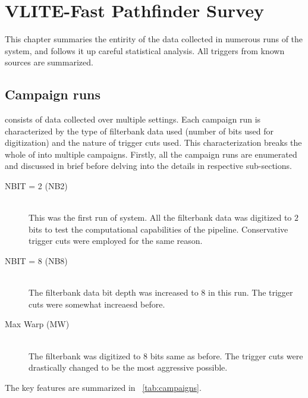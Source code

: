 \chapter{VLITE-Fast Pathfinder Survey}
\label{ch:data}

\par This chapter summaries the entirity of the data collected in numerous runs of the \vf system, and follows it up careful statistical analysis. All triggers from known sources are summarized.

\section {Campaign runs}
\label{sec:camp}

\par \vfpfs consists of data collected over multiple settings. 
Each campaign run is characterized by the type of filterbank data used (number of bits used for digitization) and the nature of trigger cuts used. 
This characterization breaks the whole of \vfpfs into multiple campaigns. 
Firstly, all the campaign runs are enumerated and discussed in brief before delving into the details in respective sub-sections.
\begin{description}
	\item[NBIT = 2 (NB2)] \\
		This was the first run of \vfpfs system. All the filterbank data was digitized to $2$ bits to test the computational capabilities of the pipeline. Conservative trigger cuts were employed for the same reason.
	\item[NBIT = 8 (NB8)] \\
		The filterbank data bit depth was increased to $8$ in this run. The trigger cuts were somewhat increaesd before.
	\item[Max Warp (MW)] \\
		The filterbank was digitized to $8$ bits same as before.
		The trigger cuts were drastically changed to be the most aggressive possible. 
\end{description}

The key features are summarized in ~\autoref{tab:campaigns}.

